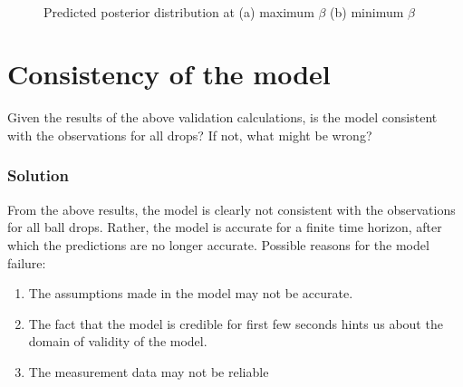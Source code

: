 \documentclass{article}
\begin{document}
\begin{figure}[H]
\begin{centering}
\,\,\,
\par\end{centering}
\caption{Predicted posterior distribution at (a) maximum $\beta$ (b) minimum
$\beta$}

\label{balldrop1t5-3-3}
\end{figure}



\section{Consistency of the model}

Given the results of the above validation calculations, is the model
consistent with the observations for all drops? If not, what might
be wrong?


\subsubsection*{Solution}

From the above results, the model is clearly not consistent with the
observations for all ball drops. Rather, the model is accurate for
a finite time horizon, after which the predictions are no longer accurate.
Possible reasons for the model failure:
\begin{enumerate}
\item The assumptions made in the model may not be accurate.
\item The fact that the model is credible for first few seconds hints us
about the domain of validity of the model.
\item The measurement data may not be reliable\end{enumerate}
\end{document}
